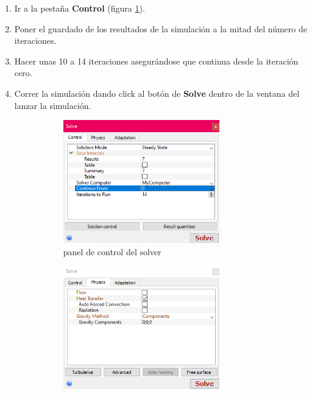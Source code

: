 \begin{enumerate}
	\item Ir a la pestaña \textbf{Control} (figura \ref{fig:control_panel}).
	\item Poner el guardado de los resultados de la simulación a la mitad del número de iteraciones.
	\item Hacer unas 10 a 14 iteraciones asegurándose que continua desde la iteración cero.
	\item Correr la simulación dando click al botón de \textbf{Solve} dentro de la ventana del lanzar la simulación.
	\begin{figure}[H]
		\centering
		\begin{subfigure}[b]{0.48\textwidth}
			\centering
			\includegraphics[width=0.8\textwidth]{figuras/Procedimiento_Simulaciones/Conduccion/control_panel.png}
			\caption{panel de control del solver}
			\label{fig:control_panel}
		\end{subfigure}
	  \hfill
		\begin{subfigure}[b]{0.48\textwidth}
			\centering
			\includegraphics[width=0.8\textwidth]{figuras/Procedimiento_Simulaciones/Conduccion/physics_panel.png}

\end{subfigure}
\end{figure}
\end{enumerate}
